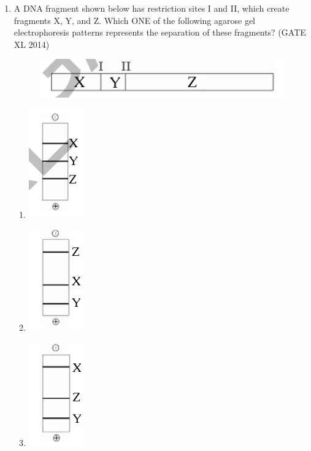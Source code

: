 \documentclass[journal,12pt,onecolumn]{IEEEtran}
\theoremstyle{remark}
\begin{document}
\begin{enumerate}
\item A DNA fragment shown below has restriction sites I and II, which create fragments X, Y, and Z. Which ONE of the following agarose gel electrophoresis patterns represents the separation of these fragments? \hfill(GATE XL 2014)\\
\begin{figure}[H]
    \centering
    \includegraphics[width=0.5\columnwidth]{fig38.png}
    \caption{}
    \label{fig:placeholder}
\end{figure}
\begin{multicols}{2}
\begin{enumerate}
\item \includegraphics[width=0.2\columnwidth]{fig39.png}
\item \includegraphics[width=0.2\columnwidth]{fig40.png}
\item \includegraphics[width=0.2\columnwidth]{fig41.png}

\end{enumerate}
\end{multicols}
\end{enumerate}
\end{document}
